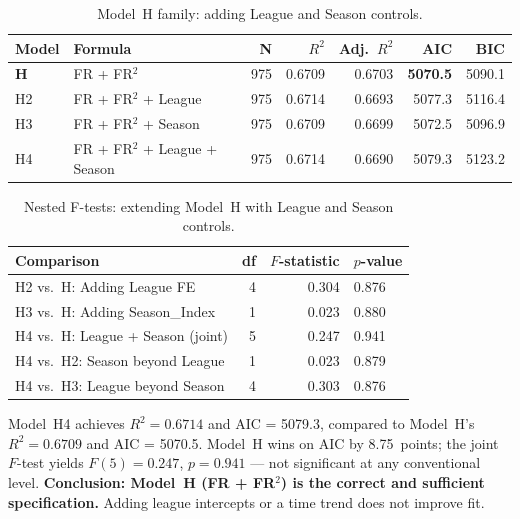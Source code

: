 \documentclass[11pt, a4paper]{article}
\begin{document}
\begin{table}[H]
  \centering
  \small
  \caption{Model~H family: adding League and Season controls.}
  \label{tab:h4comparison}
  \begin{tabular}{l l r r r r r}
    \toprule
    \rowcolor{NavyBlue}
    \color{white}\textbf{Model} &
    \color{white}\textbf{Formula} &
    \color{white}\textbf{N} &
    \color{white}\textbf{$R^{2}$} &
    \color{white}\textbf{Adj.~$R^{2}$} &
    \color{white}\textbf{AIC} &
    \color{white}\textbf{BIC} \\
    \midrule
    \rowcolor{RowB}
    \textbf{H}  & FR + FR$^{2}$                   & 975 & 0.6709 & 0.6703 & \textbf{5070.5} & 5090.1 \\
    H2 & FR + FR$^{2}$ + League          & 975 & 0.6714 & 0.6693 & 5077.3 & 5116.4 \\
    \rowcolor{RowA}
    H3 & FR + FR$^{2}$ + Season          & 975 & 0.6709 & 0.6699 & 5072.5 & 5096.9 \\
    H4 & FR + FR$^{2}$ + League + Season & 975 & 0.6714 & 0.6690 & 5079.3 & 5123.2 \\
    \bottomrule
  \end{tabular}
\end{table}

\begin{table}[H]
  \centering
  \small
  \caption{Nested F-tests: extending Model~H with League and Season controls.}
  \label{tab:h4ftests}
  \begin{tabular}{p{5.5cm} r r l}
    \toprule
    \rowcolor{NavyBlue}
    \color{white}\textbf{Comparison} &
    \color{white}\textbf{df} &
    \color{white}\textbf{$F$-statistic} &
    \color{white}\textbf{$p$-value} \\
    \midrule
    H2 vs.\ H: Adding League FE       & 4 & 0.304 & 0.876 \\
    \rowcolor{RowA}
    H3 vs.\ H: Adding Season\_Index   & 1 & 0.023 & 0.880 \\
    H4 vs.\ H: League + Season (joint) & 5 & 0.247 & 0.941 \\
    \rowcolor{RowA}
    H4 vs.\ H2: Season beyond League  & 1 & 0.023 & 0.879 \\
    H4 vs.\ H3: League beyond Season  & 4 & 0.303 & 0.876 \\
    \bottomrule
  \end{tabular}
\end{table}

Model~H4 achieves $R^2 = 0.6714$ and AIC = 5079.3, compared to Model~H's
$R^2 = 0.6709$ and AIC = 5070.5. Model~H wins on AIC by 8.75~points; the joint
$F$-test yields $F(5) = 0.247$, $p = 0.941$ --- not significant at any conventional
level. \textbf{Conclusion: Model~H (FR + FR$^2$) is the correct and sufficient
specification.} Adding league intercepts or a time trend does not improve fit.
\end{document}
